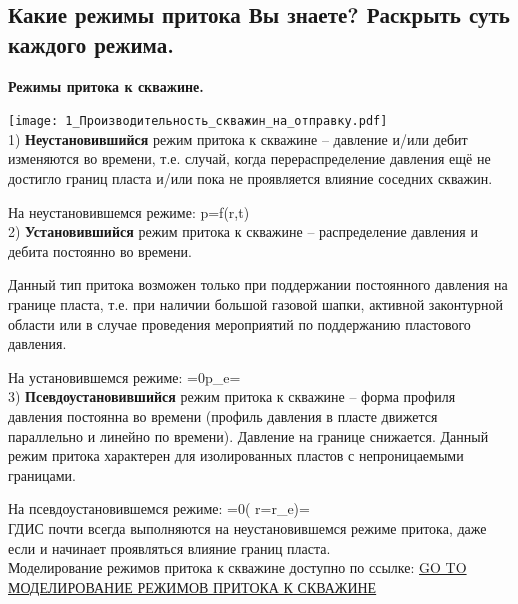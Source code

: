

\subsection{Какие режимы притока Вы знаете? Раскрыть суть каждого режима.}

\textbf{Режимы притока к скважине.}

\texttt{[image: 1\_Производительность\_скважин\_на\_отправку.pdf]}
\ \\

1) \textbf{Неустановившийся} режим притока к скважине -- давление и/или дебит изменяются во времени, т.е. случай, когда перераспределение давления ещё не достигло границ пласта и/или пока не проявляется влияние соседних скважин.

На неустановившемся режиме:
\beq
p=f(r,t)
\eeq
\ \\

2) \textbf{Установившийся} режим притока к скважине -- распределение давления и дебита постоянно во времени.

Данный тип притока возможен только при поддержании постоянного давления на границе пласта, т.е. при наличии большой газовой шапки, активной законтурной области или в случае проведения мероприятий по поддержанию пластового давления.

На установившемся режиме:
\beq
{}=0p_e=
\eeq
\ \\


3) \textbf{Псевдоустановившийся} режим притока к скважине -- форма профиля давления постоянна во времени (профиль давления в пласте движется параллельно и линейно по времени).
Давление на границе снижается.
Данный режим притока характерен для изолированных пластов с непроницаемыми границами.

На псевдоустановившемся режиме:
\beq
{}=0\left( r=r_e\right)=
\eeq
\ \\

ГДИС почти всегда выполняются на неустановившемся режиме притока, даже если и начинает проявляться влияние границ пласта.
\\

Моделирование режимов притока к скважине доступно по ссылке: \href{https://github.com/mualal/source/blob/main/well_productivity/productivity.ipynb}{GO TO МОДЕЛИРОВАНИЕ РЕЖИМОВ ПРИТОКА К СКВАЖИНЕ}

